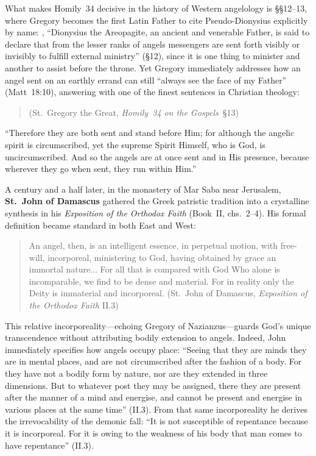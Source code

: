 What makes Homily~34 decisive in the history of Western angelology is \S\S 12--13, where Gregory becomes the first Latin Father to cite Pseudo-Dionysius explicitly by name: , ``Dionysius the Areopagite, an ancient and venerable Father, is said to declare that from the lesser ranks of angels messengers are sent forth visibly or invisibly to fulfill external ministry'' (\S 12), since it is one thing to minister and another to assist before the throne. Yet Gregory immediately addresses how an angel sent on an earthly errand can still ``always see the face of my Father'' (Matt~18:10), answering with one of the finest sentences in Christian theology:
\begin{quotation}
 (St.~Gregory the Great, \emph{Homily~34 on the Gospels}~\S 13)
\end{quotation}
``Therefore they are both sent and stand before Him; for although the angelic spirit is circumscribed, yet the supreme Spirit Himself, who is God, is uncircumscribed. And so the angels are at once sent and in His presence, because wherever they go when sent, they run within Him.''

A century and a half later, in the monastery of Mar Saba near Jerusalem, \textbf{St.~John of Damascus} gathered the Greek patristic tradition into a crystalline synthesis in his \emph{Exposition of the Orthodox Faith} (Book~II, chs.~2--4). His formal definition became standard in both East and West:
\begin{quotation}
An angel, then, is an intelligent essence, in perpetual motion, with free-will, incorporeal, ministering to God, having obtained by grace an immortal nature... For all that is compared with God Who alone is incomparable, we find to be dense and material. For in reality only the Deity is immaterial and incorporeal. (St.~John of Damascus, \emph{Exposition of the Orthodox Faith} II.3)
\end{quotation}
This relative incorporeality---echoing Gregory of Nazianzus---guards God's unique transcendence without attributing bodily extension to angels. Indeed, John immediately specifies how angels occupy place: ``Seeing that they are minds they are in mental places, and are not circumscribed after the fashion of a body. For they have not a bodily form by nature, nor are they extended in three dimensions. But to whatever post they may be assigned, there they are present after the manner of a mind and energise, and cannot be present and energise in various places at the same time'' (II.3). From that same incorporeality he derives the irrevocability of the demonic fall: ``It is not susceptible of repentance because it is incorporeal. For it is owing to the weakness of his body that man comes to have repentance'' (II.3).

